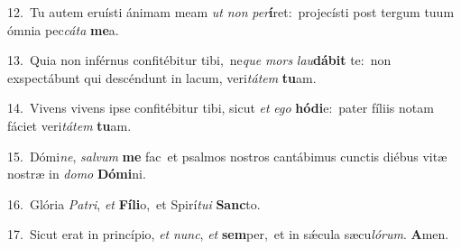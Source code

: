 {\numbfont\textcolor{\numbcolor}{12.}}~Tu autem eruísti ánimam meam \textit{ut} \textit{non} \textit{per}\-\textbf{í}ret:~\star projecísti post tergum tuum ómnia pec\-\textit{cá}\-\textit{ta} \textbf{me}\-a.\par
{\numbfont\textcolor{\numbcolor}{13.}}~Quia non inférnus confitébitur tibi,~\dagger ne\textit{que} \textit{mors} \textit{lau}\-\textbf{dá}\textbf{bit} te:~\star non exspectábunt qui descéndunt in lacum, veri\-\textit{tá}\-\textit{tem} \textbf{tu}\-am.\par
{\numbfont\textcolor{\numbcolor}{14.}}~Vivens vivens ipse confitébitur tibi, sicut \textit{et} \textit{e}\-\textit{go} \textbf{hó}\-\textbf{di}e:~\star pater fíliis notam fáciet veri\-\textit{tá}\-\textit{tem} \textbf{tu}\-am.\par
{\numbfont\textcolor{\numbcolor}{15.}}~Dómi\-\textit{ne}\-, \textit{sal}\-\textit{vum} \textbf{me} fac~\star et psalmos nostros cantábimus cunctis diébus vitæ nostræ in \textit{do}\-\textit{mo} \textbf{Dó}\-\textbf{mi}ni.\par
{\numbfont\textcolor{\numbcolor}{16.}}~Glória \textit{Pa}\-\textit{tri}, \textit{et} \textbf{Fí}\-\textbf{li}o,~\star et Spirí\-\textit{tu}\-\textit{i} \textbf{Sanc}\-to.\par
{\numbfont\textcolor{\numbcolor}{17.}}~Sicut erat in princípio, \textit{et} \textit{nunc}\-, \textit{et} \textbf{sem}\-per,~\star et in sǽcula sæcu\-\textit{ló}\-\textit{rum}. \textbf{A}\-men.\par
